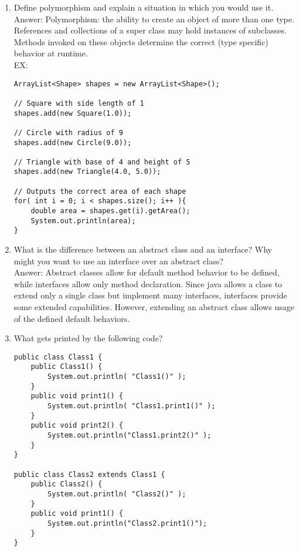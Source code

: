 \documentclass[11pt]{article}
\newenvironment{answer}{\large\lstset{basicstyle=\large\ttfamily}\color{white} \small{Answer:}\large}{}
\newenvironment{answer}{\large\lstset{basicstyle=\large\ttfamily}\color{red} \small{Answer:}\large}{}
\begin{document}
\begin{enumerate}
\item Define polymorphism and explain a situation in which you would use it. \\
\begin{answer}
Polymorphism: the ability to create an object of more than one type. References and collections of a super class may hold instances of subclasses. Methods invoked on these objects determine the correct (type specific) behavior at runtime. \\
EX:
		\begin{lstlisting}
ArrayList<Shape> shapes = new ArrayList<Shape>();

// Square with side length of 1
shapes.add(new Square(1.0));

// Circle with radius of 9
shapes.add(new Circle(9.0));

// Triangle with base of 4 and height of 5
shapes.add(new Triangle(4.0, 5.0));

// Outputs the correct area of each shape
for( int i = 0; i < shapes.size(); i++ ){ 
   	double area = shapes.get(i).getArea();
   	System.out.println(area);
}
        \end{lstlisting}
\end{answer}



\item What is the difference between an abstract class and an interface? Why might you want to use an interface over an abstract class? \\
\begin{answer}
Abstract classes allow for default method behavior to be defined, while interfaces allow only method declaration.  Since java allows a class to extend only a single class but implement many interfaces, interfaces provide some extended capabilities. However, extending an abstract class allows usage of the defined default behaviors. 
\end{answer}


\newpage


\item What gets printed by the following code?
\begin{lstlisting}
public class Class1 {
	public Class1() {
		System.out.println( "Class1()" );
	}
	public void print1() {
		System.out.println( "Class1.print1()" );
	}
	public void print2() {
		System.out.println("Class1.print2()" );
	}
}

public class Class2 extends Class1 {
	public Class2() {
		System.out.println( "Class2()" );
	}
	public void print1() {
		System.out.println("Class2.print1()");
	}
}


\end{lstlisting}
\end{enumerate}
\end{document}
